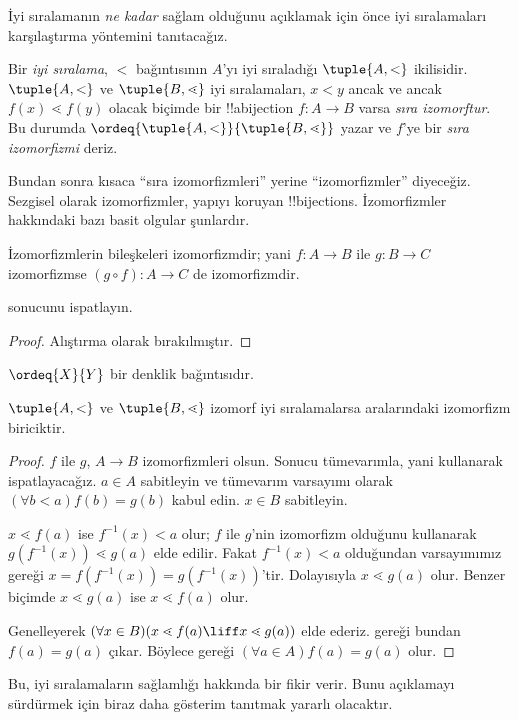 


İyi sıralamanın \emph{ne kadar} sağlam olduğunu açıklamak için önce iyi
sıralamaları karşılaştırma yöntemini tanıtacağız.

\begin{defn}
Bir \emph{iyi sıralama}, $<$ bağıntısının $A$'yı iyi sıraladığı
$\tuple{A,<}$ ikilisidir. $\tuple{A,<}$ ve $\tuple{B,\lessdot}$ iyi
sıralamaları, $x<y$ ancak ve ancak $f(x)\lessdot f(y)$ olacak biçimde bir
!!a{bijection} $f\colon A\to B$ varsa \emph{sıra izomorftur}. Bu durumda
$\ordeq{\tuple{A,<}}{\tuple{B,\lessdot}}$ yazar ve $f$'ye bir
\emph{sıra izomorfizmi} deriz.
\end{defn}
\noindent
Bundan sonra kısaca ``sıra izomorfizmleri'' yerine ``izomorfizmler''
diyeceğiz. Sezgisel olarak izomorfizmler, yapıyı koruyan
!!{bijection}s. İzomorfizmler hakkındaki bazı basit olgular şunlardır.

\begin{lem}
İzomorfizmlerin bileşkeleri izomorfizmdir; yani $f\colon A\to B$ ile
$g\colon B\to C$ izomorfizmse $(g\circ f)\colon A\to C$ de izomorfizmdir.
\end{lem}
\begin{prob}
	 sonucunu ispatlayın.
\end{prob}
\begin{proof}
Alıştırma olarak bırakılmıştır.
\end{proof}
\begin{cor}
	$\ordeq{X}{Y}$ bir denklik bağıntısıdır.
\end{cor}
\begin{prop}
$\tuple{A,<}$ ve $\tuple{B,\lessdot}$ izomorf iyi sıralamalarsa aralarındaki
izomorfizm biriciktir.
\end{prop}

\begin{proof}
$f$ ile $g$, $A\to B$ izomorfizmleri olsun. Sonucu tümevarımla, yani
 kullanarak ispatlayacağız. $a\in A$ sabitleyin
ve tümevarım varsayımı olarak $(\forall b<a)f(b)=g(b)$ kabul edin.
$x\in B$ sabitleyin.

$x\lessdot f(a)$ ise $f^{-1}(x)<a$ olur; $f$ ile $g$'nin izomorfizm
olduğunu kullanarak $g(f^{-1}(x))\lessdot g(a)$ elde edilir. Fakat
$f^{-1}(x)<a$ olduğundan varsayımımız gereği
$x=f(f^{-1}(x))=g(f^{-1}(x))$'tir. Dolayısıyla $x\lessdot g(a)$ olur.
Benzer biçimde $x\lessdot g(a)$ ise $x\lessdot f(a)$ olur.

Genelleyerek $(\forall x\in B)(x\lessdot f(a)\liff x\lessdot g(a))$
elde ederiz. 
gereği bundan $f(a)=g(a)$ çıkar. Böylece
 gereği $(\forall a\in A)f(a)=g(a)$ olur.
\end{proof}\noindent
Bu, iyi sıralamaların sağlamlığı hakkında bir fikir verir. Bunu açıklamayı
sürdürmek için biraz daha gösterim tanıtmak yararlı olacaktır.

